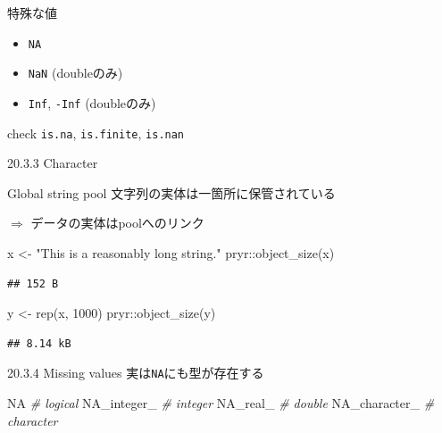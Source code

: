 \documentclass[
  ignorenonframetext,
]{beamer}
\newenvironment{Shaded}{\begin{snugshade}}{\end{snugshade}}
\newcommand{\CommentTok}[1]{\textcolor[rgb]{0.56,0.35,0.01}{\textit{#1}}}
\newcommand{\ConstantTok}[1]{\textcolor[rgb]{0.00,0.00,0.00}{#1}}
\newcommand{\DecValTok}[1]{\textcolor[rgb]{0.00,0.00,0.81}{#1}}
\newcommand{\FunctionTok}[1]{\textcolor[rgb]{0.00,0.00,0.00}{#1}}
\newcommand{\NormalTok}[1]{#1}
\newcommand{\OtherTok}[1]{\textcolor[rgb]{0.56,0.35,0.01}{#1}}
\newcommand{\SpecialCharTok}[1]{\textcolor[rgb]{0.00,0.00,0.00}{#1}}
\newcommand{\StringTok}[1]{\textcolor[rgb]{0.31,0.60,0.02}{#1}}
\providecommand{\tightlist}{%
  \setlength{\itemsep}{0pt}\setlength{\parskip}{0pt}}
\begin{document}
\begin{frame}[fragile]{特殊な値}
\protect\hypertarget{ux7279ux6b8aux306aux5024}{}
\begin{itemize}
\tightlist
\item
  \texttt{NA}
\item
  \texttt{NaN} (doubleのみ)
\item
  \texttt{Inf}, \texttt{-Inf} (doubleのみ)
\end{itemize}

\begin{block}{check}
\protect\hypertarget{check}{}
\texttt{is.na}, \texttt{is.finite}, \texttt{is.nan}
\end{block}
\end{frame}

\begin{frame}{20.3.3 Character}
\protect\hypertarget{character}{}
\end{frame}

\begin{frame}[fragile]{Global string pool}
\protect\hypertarget{global-string-pool}{}
文字列の実体は一箇所に保管されている

\(\Rightarrow\) データの実体はpoolへのリンク

\begin{Shaded}
\begin{Highlighting}[]
\NormalTok{x }\OtherTok{\textless{}{-}} \StringTok{"This is a reasonably long string."}
\NormalTok{pryr}\SpecialCharTok{::}\FunctionTok{object\_size}\NormalTok{(x)}
\end{Highlighting}
\end{Shaded}

\begin{verbatim}
## 152 B
\end{verbatim}

\begin{Shaded}
\begin{Highlighting}[]
\NormalTok{y }\OtherTok{\textless{}{-}} \FunctionTok{rep}\NormalTok{(x, }\DecValTok{1000}\NormalTok{)}
\NormalTok{pryr}\SpecialCharTok{::}\FunctionTok{object\_size}\NormalTok{(y)}
\end{Highlighting}
\end{Shaded}

\begin{verbatim}
## 8.14 kB
\end{verbatim}
\end{frame}

\begin{frame}[fragile]{20.3.4 Missing values}
\protect\hypertarget{missing-values}{}
実は\texttt{NA}にも型が存在する

\begin{Shaded}
\begin{Highlighting}[]
\ConstantTok{NA}            \CommentTok{\# logical}
\ConstantTok{NA\_integer\_}   \CommentTok{\# integer}
\ConstantTok{NA\_real\_}      \CommentTok{\# double}
\ConstantTok{NA\_character\_} \CommentTok{\# character}
\end{Highlighting}
\end{Shaded}
\end{frame}
\end{document}
